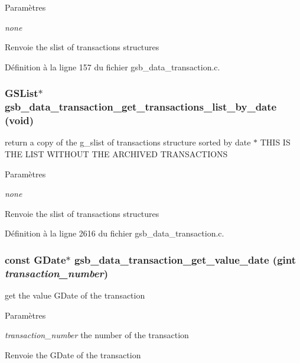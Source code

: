 \begin{DoxyParams}{Paramètres}
\item[{\em none}]\end{DoxyParams}
\begin{DoxyReturn}{Renvoie}
the slist of transactions structures 
\end{DoxyReturn}


Définition à la ligne 157 du fichier gsb\_\-data\_\-transaction.c.

\subsubsection[{gsb\_\-data\_\-transaction\_\-get\_\-transactions\_\-list\_\-by\_\-date}]{\setlength{\rightskip}{0pt plus 5cm}GSList$\ast$ gsb\_\-data\_\-transaction\_\-get\_\-transactions\_\-list\_\-by\_\-date (void)}\label{gsb__data__transaction_8c_ad256f5a749101f04cc270ce095eb9664}
return a copy of the g\_\-slist of transactions structure sorted by date $\ast$ THIS IS THE LIST WITHOUT THE ARCHIVED TRANSACTIONS


\begin{DoxyParams}{Paramètres}
\item[{\em none}]\end{DoxyParams}
\begin{DoxyReturn}{Renvoie}
the slist of transactions structures 
\end{DoxyReturn}


Définition à la ligne 2616 du fichier gsb\_\-data\_\-transaction.c.

\subsubsection[{gsb\_\-data\_\-transaction\_\-get\_\-value\_\-date}]{\setlength{\rightskip}{0pt plus 5cm}const GDate$\ast$ gsb\_\-data\_\-transaction\_\-get\_\-value\_\-date (gint {\em transaction\_\-number})}\label{gsb__data__transaction_8c_a5851b4114a8f23b40107fba99ae2fbef}
get the value GDate of the transaction 
\begin{DoxyParams}{Paramètres}
\item[{\em transaction\_\-number}]the number of the transaction \end{DoxyParams}
\begin{DoxyReturn}{Renvoie}
the GDate of the transaction 
\end{DoxyReturn}


